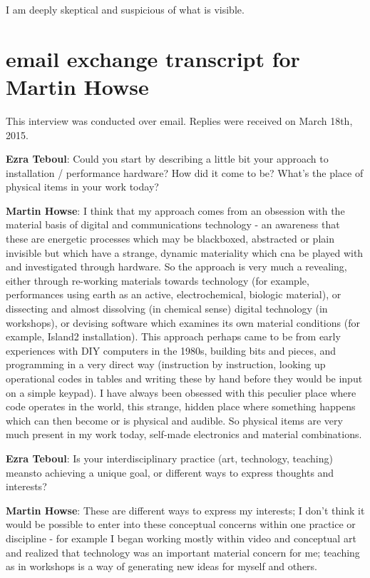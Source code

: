 I am deeply skeptical and suspicious of what is visible. 

\newpage

\clearpage 
\section{email exchange transcript for Martin Howse}

This interview was conducted over email. Replies were received on March 18th, 2015. 

\textbf{Ezra Teboul}: Could you start by describing a little bit your approach to
installation / performance hardware? How did it come to be? What's the place of physical
items in your work today?

\textbf{Martin Howse}: I think that my approach comes from an obsession with the
material basis of digital and communications technology - an awareness that these are
energetic processes which may be blackboxed, abstracted or plain invisible but which
have a strange, dynamic materiality which cna be played with and investigated through
hardware. So the approach is very much a revealing, either through re-working materials
towards technology (for example, performances using earth as an active, electrochemical,
biologic material), or dissecting and almost dissolving (in chemical sense) digital
technology (in workshops), or devising software which examines its own material
conditions (for example, Island2 installation). This approach perhaps came to be from
early experiences with DIY computers in the 1980s, building bits and pieces, and
programming in a very direct way (instruction by instruction, looking up operational
codes in tables and writing these by hand before they would be input on a simple
keypad). I have always been obsessed with this peculier place where code operates in the
world, this strange, hidden place where something happens which can then become or is
physical and audible. So physical items are very much present in my work today,
self-made electronics and material combinations.

\textbf{Ezra Teboul}: Is your interdisciplinary practice (art, technology, teaching)
meansto achieving a unique goal, or different ways to express thoughts and interests?

\textbf{Martin Howse}: These are different ways to express my interests; I don't think
it would be possible to enter into these conceptual concerns within one practice or
discipline - for example I began working mostly within video and conceptual art and
realized that technology was an important material concern for me; teaching as in
workshops is a way of generating new ideas for myself and others.

